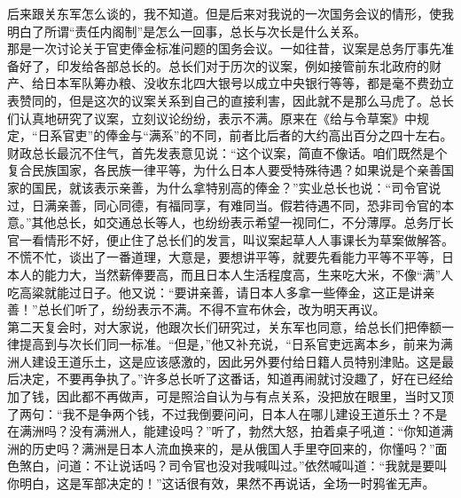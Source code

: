 后来跟关东军怎么谈的，我不知道。但是后来对我说的一次国务会议的情形，使我明白了所谓“责任内阁制”是怎么一回事，总长与次长是什么关系。\\

那是一次讨论关于官吏俸金标准问题的国务会议。一如往昔，议案是总务厅事先准备好了，印发给各部总长的。总长们对于历次的议案，例如接管前东北政府的财产、给日本军队筹办粮、没收东北四大银号以成立中央银行等等，都是毫不费劲立表赞同的，但是这次的议案关系到自己的直接利害，因此就不是那么马虎了。总长们认真地研究了议案，立刻议论纷纷，表示不满。原来在《给与令草案》中规定，“日系官吏”的俸金与“满系”的不同，前者比后者的大约高出百分之四十左右。财政总长最沉不住气，首先发表意见说：“这个议案，简直不像话。咱们既然是个复合民族国家，各民族一律平等，为什么日本人要受特殊待遇？如果说是个亲善国家的国民，就该表示亲善，为什么拿特别高的俸金？”实业总长也说：“司令官说过，日满亲善，同心同德，有福同享，有难同当。假若待遇不同，恐非司令官的本意。”其他总长，如交通总长等人，也纷纷表示希望一视同仁，不分薄厚。总务厅长官一看情形不好，便止住了总长们的发言，叫议案起草人人事课长为草案做解答。不慌不忙，谈出了一番道理，大意是，要想讲平等，就要先看能力平等不平等，日本人的能力大，当然薪俸要高，而且日本人生活程度高，生来吃大米，不像“满”人吃高粱就能过日子。他又说：“要讲亲善，请日本人多拿一些俸金，这正是讲亲善！”总长们听了，纷纷表示不满。不得不宣布休会，改为明天再议。\\

第二天复会时，对大家说，他跟次长们研究过，关东军也同意，给总长们把俸额一律提高到与次长们同一标准。“但是，”他又补充说，“日系官吏远离本乡，前来为满洲人建设王道乐土，这是应该感激的，因此另外要付给日籍人员特别津贴。这是最后决定，不要再争执了。”许多总长听了这番话，知道再闹就讨没趣了，好在已经给加了钱，因此都不再做声，可是照洽自认为与有点关系，没把放在眼里，当时又顶了两句：“我不是争两个钱，不过我倒要问问，日本人在哪儿建设王道乐土？不是在满洲吗？没有满洲人，能建设吗？”听了，勃然大怒，拍着桌子吼道：“你知道满洲的历史吗？满洲是日本人流血换来的，是从俄国人手里夺回来的，你懂吗？”面色煞白，问道：不让说话吗？司令官也没对我喊叫过。”依然喊叫道：“我就是要叫你明白，这是军部决定的！”这话很有效，果然不再说话，全场一时鸦雀无声。\\

